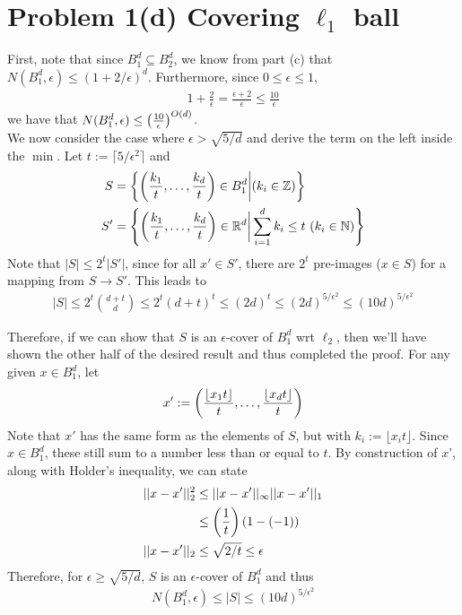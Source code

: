 \documentclass[11pt]{article}
\newcommand{\1}{\mathbb{I}} %
\begin{document}
\clearpage
\section*{Problem 1(d) Covering $\ell_1$ ball}

First, note that since $B_1^d \subseteq B_2^d$,  we know from part (c) that $N(B_1^d, \epsilon) \leq (1 + 2/\epsilon)^d$. Furthermore, since $0 \leq \epsilon \leq 1$, 
\begin{align}
	1 + \frac{2}{\epsilon} = \frac{\epsilon + 2}{\epsilon} \leq \frac{10}{\epsilon}
\end{align}
we have that $N(B_1^d, \epsilon)  \leq \left(  \frac{10}{\epsilon}  \right)^{  O(d)  }$. \\


We now consider the case where $\epsilon > \sqrt{5/d}$ and derive the term on the left inside the $\min$. Let $t := \lceil 5 / \epsilon^2 \rceil$ and 
\begin{align}
	S 
		&= \left\{ \left(  \frac{k_1}{t}, \ldots, \frac{k_d}{t}  \right) \in B_1^d \bigg| (k_i \in \mathbb Z)  \right\} \\
	S' 
		&= \left\{ \left(  \frac{k_1}{t}, \ldots, \frac{k_d}{t}  \right) \in \mathbb{R}^d \bigg| \sum_{i=1}^{d} k_i \leq t ~ (k_i \in \mathbb N)  \right\}
\end{align}
Note that $|S| \leq 2^t |S'|$, since for all $x' \in S'$, there are $2^t$ pre-images ($x \in S$) for a mapping from $S \to S'$. This leads  to
\begin{align}
	|S| \leq 2^t {d+t \choose d} \leq 2^t (d + t)^t \leq (2d)^t \leq (2d)^{5/\epsilon^2}  \leq (10d)^{5/\epsilon^2}
\end{align}

Therefore, if we can show that $S$ is an $\epsilon$-cover of $B_1^d$ wrt $\ell_2$, then we'll have shown the other half of the desired result and thus completed the proof. For any given $x \in B_1^d$, let 
\begin{align}
	x' := \left(   \frac{ \lfloor x_1 t \rfloor   }{t}, \ldots, \frac{ \lfloor x_d t \rfloor   }{t}   \right)
\end{align}
Note that $x'$ has the same form as the elements of $S$, but with $k_i := \lfloor x_i t \rfloor$. Since $x \in B_1^d$, these still sum to a number less than or equal to $t$. By construction of $x$', along with Holder's inequality, we can state
\begin{align}
	||x - x'||_{2}^{2} 	
		&\leq ||x - x'||_{\infty} ||x - x'||_1 \\
		&\leq \left( \frac{1}{t} \right) \left( 1 - (-1) \right) \\
	||x - x'||_2 
		&\leq \sqrt{2/t} \leq \epsilon
\end{align}
Therefore, for $\epsilon \geq \sqrt{5 /d}$, $S$ is an $\epsilon$-cover of $B_1^d$ and thus
\begin{align}
N(B_1^d, \epsilon) \leq |S| \leq (10d)^{5/\epsilon^2}
\end{align}
\end{document}
